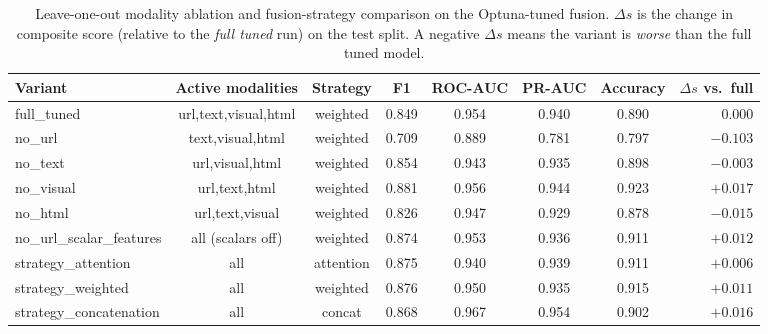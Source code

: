 \documentclass[conference]{IEEEtran}
\begin{document}
\begin{table}[t]
\caption{Leave-one-out modality ablation and fusion-strategy comparison
on the Optuna-tuned fusion.  $\Delta s$ is the change in composite score
(relative to the \emph{full tuned} run) on the test split.  A negative
$\Delta s$ means the variant is \emph{worse} than the full tuned model.}
\label{tab:ablation}
\centering
\small
\begin{tabular}{lccccccr}
\toprule
Variant & Active modalities & Strategy & F1 & ROC-AUC & PR-AUC & Accuracy & $\Delta s$ vs.\ full \\
\midrule
full\_tuned         & url,text,visual,html & weighted & 0.849 & 0.954 & 0.940 & 0.890 & $\phantom{-}0.000$ \\
no\_url             & text,visual,html     & weighted & 0.709 & 0.889 & 0.781 & 0.797 & $-0.103$ \\
no\_text            & url,visual,html      & weighted & 0.854 & 0.943 & 0.935 & 0.898 & $-0.003$ \\
no\_visual          & url,text,html        & weighted & 0.881 & 0.956 & 0.944 & 0.923 & $+0.017$ \\
no\_html            & url,text,visual      & weighted & 0.826 & 0.947 & 0.929 & 0.878 & $-0.015$ \\
no\_url\_scalar\_features & all (scalars off) & weighted & 0.874 & 0.953 & 0.936 & 0.911 & $+0.012$ \\
strategy\_attention & all                  & attention & 0.875 & 0.940 & 0.939 & 0.911 & $+0.006$ \\
strategy\_weighted  & all                  & weighted  & 0.876 & 0.950 & 0.935 & 0.915 & $+0.011$ \\
strategy\_concatenation & all              & concat    & 0.868 & 0.967 & 0.954 & 0.902 & $+0.016$ \\
\bottomrule
\end{tabular}
\end{table}
\end{document}
